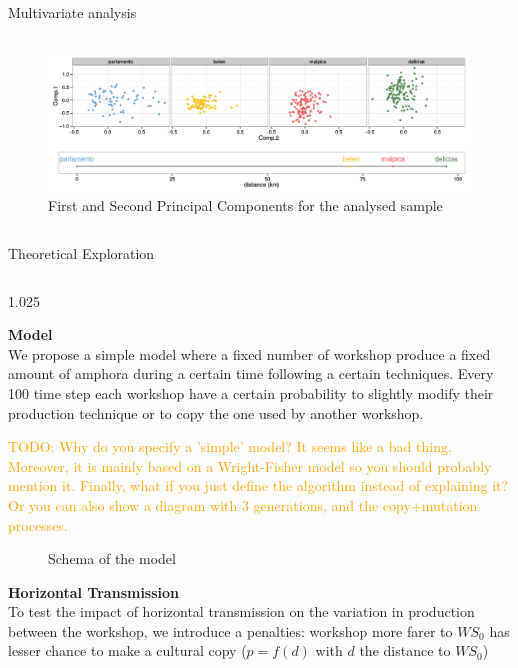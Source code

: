 \documentclass[final]{beamer}
\newlength{\onecolwid}
\newlength{\twocolwid}
\newcommand{\memo}[2]{\textcolor{#1}{#2}}
\newcommand{\xavi}[1]{\memo{orange}{TODO: #1\\}}
\begin{document}
\begin{frame}[t]
\begin{columns}[t]
\begin{column}{\twocolwid}
\begin{block}{Multivariate analysis}
\begin{columns}[t,totalwidth=\twocolwid]
\begin{column}{\onecolwid} %


\begin{figure}
\includegraphics[width=0.6\linewidth]{images/fig2.png}
\caption{First and Second Principal Components for the analysed sample}
\label{fig:pca}
\end{figure}


\end{column}
\end{columns}

\end{block}

\begin{block}{Theoretical Exploration}

\begin{columns}[t,totalwidth=\twocolwid]

\begin{column}{1.025\onecolwid} %

{\textbf{Model}}\\
\justify
We propose a simple model where a fixed number of workshop produce a fixed amount of amphora during a certain time following a certain techniques. Every 100 time step each workshop have a certain probability to slightly modify their production technique or to copy the one used by another workshop.

\xavi{Why do you specify a 'simple' model? It seems like a bad thing. Moreover, it is mainly based on a Wright-Fisher model so you should probably mention it. Finally, what if you just define the algorithm instead of explaining it? Or you can also show a diagram with 3 generations, and the copy+mutation processes.}

\begin{figure}
	    \centering
    
    \caption{Schema of the model}
    \label{fig:mod}
\end{figure}

{\textbf{Horizontal Transmission}}\\
\justify
To test the impact of horizontal transmission on the variation in production between the workshop, we introduce a penalties: workshop more farer to $WS_0$ has lesser chance to make a cultural copy ($p=f(d)$ with $d$ the distance to $WS_0$)


\end{column}
\end{columns}
\end{block}
\end{column}
\end{columns}
\end{frame}
\end{document}
